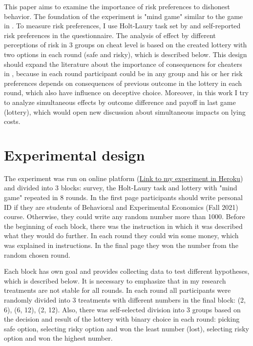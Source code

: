 \documentclass[12pt]{article}
\begin{document}
	 This paper aims to examine the importance of risk preferences to dishonest behavior. The foundation of the experiment is "mind game"  similar to the game in  \cite{mol2020not}. To measure risk preferences, I use Holt-Laury task set by \cite{holt2002risk} and self-reported risk preferences in the questionnaire. The analysis of effect by different perceptions of risk in 3 groups on cheat level is based on the created lottery with two options in each round (safe and risky), which is described below. This design should expand the literature about the importance of consequences for cheaters in \cite{gneezy2005deception, zimerman2014self, gneezy2018lying}, because in each round participant could be in any group and his or her risk preferences depends on consequences of previous outcome in the lottery in each round, which also have influence on deceptive choice. Moreover, in this work I try to analyze simultaneous effects by outcome difference and payoff in last game (lottery), which would open new discussion about simultaneous impacts on lying costs.

	\section{Experimental design}\label{design}
	
	The experiment was run on online platform (\href{https://cheatriskgame.herokuapp.com/join/pububagu}{Link to my experiment in Heroku}) and divided into 3 blocks: survey, the Holt-Laury task and lottery with "mind game" repeated  in 8 rounds.
	In the first page participants should write personal ID if they are students of Behavioral and Experimental Economics (Fall 2021) course. Otherwise, they could write any random number more than 1000. Before the beginning of each block, there was the instruction in which it was described what they would do further. In each round they could win some money, which was explained in instructions. In the final page they won the number from the random chosen round. 
	
	Each block has own goal and provides collecting data to test different hypotheses, which is described below. It is necessary to emphasize that in my research treatments are not stable for all rounds. In each round all participants were randomly divided into 3 treatments with different numbers in the final block: (2, 6), (6, 12), (2, 12). Also, there was self-selected division into 3 groups based on the decision and result of the lottery with binary choice in each round: picking safe option, selecting risky option and won the least number (lost), selecting risky option and won the highest number.
	
\end{document}
